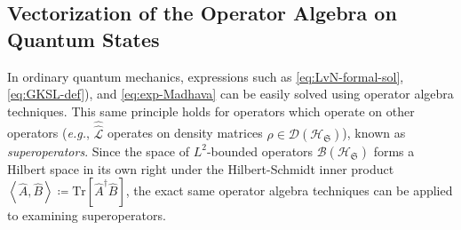 \documentclass[preprints,article,accept,moreauthors,pdftex]{Definitions/mdpi}
\begin{document}
\begin{paracol}{2}
\section{Vectorization of the Operator Algebra on Quantum States}
\label{app:vectorization}
In ordinary quantum mechanics, expressions such as \eqref{eq:LvN-formal-sol}, \eqref{eq:GKSL-def}), and \eqref{eq:exp-Madhava} can be easily solved using operator algebra techniques. This same principle holds for operators which operate on other operators (\emph{e.g.}, $\hat{\hat{\mathcal{L}}}$ operates on density matrices $\rho\in\mathcal{D}\left(\mathcal{H}_{\mathfrak{S}}\right)$), known as \emph{superoperators}. Since the space of $L^{2}$-bounded operators $\mathcal{B}\left(\mathcal{H}_{\mathfrak{S}}\right)$ forms a Hilbert space in its own right under the Hilbert-Schmidt inner product $\left\langle\widehat{A},\widehat{B}\right\rangle\coloneqq\mathrm{Tr}\left[\widehat{A}^{\dagger}\widehat{B}\right]$, the exact same operator algebra techniques can be applied to examining superoperators.


\end{paracol}
\end{document}
